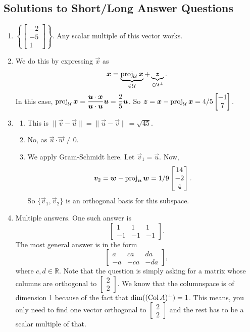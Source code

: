 \subsection{Solutions to Short/Long Answer Questions}
\begin{enumerate}
	\item[\textbf{Q1}] \(\left\{\begin{bmatrix}-2 \\ -5 \\ 1\end{bmatrix}\right\}\). Any scalar multiple of this vector works.
	
	\item[\textbf{Q2}] We do this by expressing \(\vec{x}\) as \[\bm{x} = \underbrace{\operatorname{proj}_\mathcal{U}\bm{x}}_{\in \mathcal{U}} + \underbrace{\bm{z}}_{\in \mathcal{U}^\perp}.\] In this case, 
				   \(\operatorname{proj}_\mathcal{U}\bm{x} = \displaystyle \frac{\bm{u} \cdot \bm{x}}{\bm{u} \cdot \bm{u}}\bm{u} = \frac{2}{5}\bm{u}\). So
				   \(\bm{z} = \bm{x} - \operatorname{proj}_\mathcal{U} \bm{x} = 4/5\begin{bmatrix}-1 \\ 7\end{bmatrix}.\)
	
	\item[\textbf{Q3}]
			\begin{enumerate}
				\item This is \(\|\vec{v} - \vec{u}\| = \|\vec{u} - \vec{v}\| = \sqrt{45}\).
				\item No, as \(\vec{u} \cdot \vec{w} \ne 0\).
				\item We apply Gram-Schmidt here. Let \(\vec{v}_1 = \vec{u}\). Now, \[\bm{v}_2 = \bm{w}  - \operatorname{proj}_{\bm{u}} \bm{w} 
					= 1/9\begin{bmatrix}14 \\ -2 \\ 4 \end{bmatrix}.\] So \(\{\vec{v}_1, \vec{v}_2\}\) is an orthogonal basis for this subspace.
			\end{enumerate}
			
	
	\item[\textbf{Q4}] Multiple answers. One such answer is \[\begin{bmatrix}1 & 1 & 1 \\ -1 & -1 & -1\end{bmatrix}.\] The most general answer is in the form 
			\[\begin{bmatrix}a & ca & da \\ -a & -ca & -da\end{bmatrix},\] where \(c, d \in \mathbb{R}.\) Note that the question is simply asking for
			a matrix whose columns are orthogonal to \(\begin{bmatrix}2 \\ 2\end{bmatrix}\). We know that the columnspace is of dimension 1 because
			of the fact that \(\dim((\operatorname{Col} A)^\perp) = 1\). This means, you only need to find one vector orthogonal to 
			\(\begin{bmatrix}2 \\ 2\end{bmatrix}\) and the rest has to be a scalar multiple of that.


\end{enumerate}
